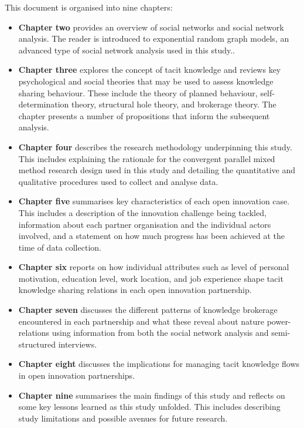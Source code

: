 This document is organised into nine chapters:

\begin{itemize}[leftmargin=0pt]
  \item[] \textbf{Chapter two} provides an overview of social networks and social network analysis. The reader is introduced to exponential random graph models, an advanced type of social network analysis used in this study..
  
  \item[] \textbf{Chapter three} explores the concept of tacit knowledge and reviews key psychological and social theories that may be used to assess knowledge sharing behaviour. These include the theory of planned behaviour, self-determination theory, structural hole theory, and brokerage theory. The chapter presents a number of propositions that inform the subsequent analysis.
  
  \item[] \textbf{Chapter four} describes the research methodology underpinning this study. This includes explaining the rationale for the convergent parallel mixed method research design used in this study and detailing the quantitative and qualitative procedures used to collect and analyse data.
  
  \item[] \textbf{Chapter five} summarises key characteristics of each open innovation case. This includes a description of the innovation challenge being tackled, information about each partner organisation and the individual actors involved, and a statement on how much progress has been achieved at the time of data collection.
  
  \item[] \textbf{Chapter six} reports on how individual attributes such as level of personal motivation, education level, work location, and job experience shape tacit knowledge sharing relations in each open innovation partnership.
  
  \item[] \textbf{Chapter seven} discusses the different patterns of knowledge brokerage encountered in each partnership and what these reveal about nature power-relations using information from both the social network analysis and semi-structured interviews.
  
  \item[] \textbf{Chapter eight} discusses the implications for managing tacit knowledge flows in open innovation partnerships. 
  
  \item[] \textbf{Chapter nine} summarises the main findings of this study and reflects on some key lessons learned as this study unfolded. This includes describing study limitations and possible avenues for future research. 
\end{itemize}